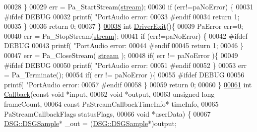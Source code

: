 \begin{DoxyCode}
{{00028     \}
00029     err = Pa\_StartStream(\hyperlink{_driver_8cpp_aa2fbdaf8db29dee4b723a45b890cd92a}{stream});
00030     \textcolor{keywordflow}{if} (err!=paNoError) \{
00031 \textcolor{preprocessor}{#ifdef DEBUG}
00032         printf(  \textcolor{stringliteral}{"PortAudio error: %
00033 \textcolor{preprocessor}{#endif}
00034         \textcolor{keywordflow}{return} 1;
00035     \}
00036     \textcolor{keywordflow}{return} 0;
00037 \}
\hypertarget{_driver_8cpp_source_l00038}{}\hyperlink{_driver_8h_a0e985fca408fe471f534ee98a2bd5733}{00038} \textcolor{keywordtype}{int} \hyperlink{_driver_8cpp_a0e985fca408fe471f534ee98a2bd5733}{DriverExit}()\{
00039     PaError err=0;
00040     err = Pa\_StopStream(\hyperlink{_driver_8cpp_aa2fbdaf8db29dee4b723a45b890cd92a}{stream});
00041     \textcolor{keywordflow}{if} (err!=paNoError) \{
00042 \textcolor{preprocessor}{#ifdef DEBUG}
00043         printf(  \textcolor{stringliteral}{"PortAudio error: %
00044 \textcolor{preprocessor}{#endif}
00045         \textcolor{keywordflow}{return} 1;
00046     \}
00047     err = Pa\_CloseStream( \hyperlink{_driver_8cpp_aa2fbdaf8db29dee4b723a45b890cd92a}{stream} );
00048     \textcolor{keywordflow}{if}( err != paNoError )\{
00049 \textcolor{preprocessor}{#ifdef DEBUG}
00050         printf(  \textcolor{stringliteral}{"PortAudio error: %
00051 \textcolor{preprocessor}{#endif}
00052     \}
00053     err = Pa\_Terminate();
00054     \textcolor{keywordflow}{if}( err != paNoError )\{
00055 \textcolor{preprocessor}{#ifdef DEBUG}
00056         printf(  \textcolor{stringliteral}{"PortAudio error: %
00057 \textcolor{preprocessor}{#endif}
00058     \}
00059     \textcolor{keywordflow}{return} 0;
00060 \}
\hypertarget{_driver_8cpp_source_l00061}{}\hyperlink{_driver_8h_a110986770da2cd49dcf3789f8cc09c28}{00061} \textcolor{keywordtype}{int} \hyperlink{_driver_8cpp_a110986770da2cd49dcf3789f8cc09c28}{Callback}(\textcolor{keyword}{const} \textcolor{keywordtype}{void} *input,
00062              \textcolor{keywordtype}{void} *output,
00063              \textcolor{keywordtype}{unsigned} \textcolor{keywordtype}{long} frameCount,
00064              \textcolor{keyword}{const} PaStreamCallbackTimeInfo* timeInfo,
00065              PaStreamCallbackFlags statusFlags,
00066              \textcolor{keywordtype}{void} *userData) \{
00067     \hyperlink{namespace_d_s_g_ac39a94cd27ebcd9c1e7502d0c624894a}{DSG::DSGSample}* \_out = (\hyperlink{namespace_d_s_g_ac39a94cd27ebcd9c1e7502d0c624894a}{DSG::DSGSample}*)output;
}}}}}}
\end{DoxyCode}
